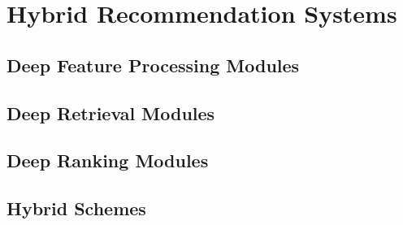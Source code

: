 %
%
%
\chapter{Hybrid Recommendation Systems}
\label{intro} %

\section{Deep Feature Processing Modules}
\section{Deep Retrieval Modules}
\section{Deep Ranking Modules}
\section{Hybrid Schemes}



